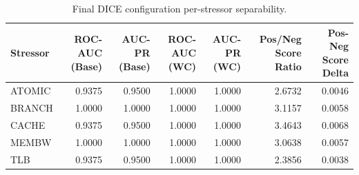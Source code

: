 \begin{table}[t]
\centering
\caption{Final DICE configuration per-stressor separability.}
\label{tab:dice_full_stressor}
\footnotesize
\begin{tabular}{lrrrrrr}
\toprule
Stressor & ROC-AUC (Base) & AUC-PR (Base) & ROC-AUC (WC) & AUC-PR (WC) & Pos/Neg Score Ratio & Pos-Neg Score Delta \\
\midrule
ATOMIC & 0.9375 & 0.9500 & 1.0000 & 1.0000 & 2.6732 & 0.0046 \\
BRANCH & 1.0000 & 1.0000 & 1.0000 & 1.0000 & 3.1157 & 0.0058 \\
CACHE & 0.9375 & 0.9500 & 1.0000 & 1.0000 & 3.4643 & 0.0068 \\
MEMBW & 1.0000 & 1.0000 & 1.0000 & 1.0000 & 3.0638 & 0.0057 \\
TLB & 0.9375 & 0.9500 & 1.0000 & 1.0000 & 2.3856 & 0.0038 \\
\bottomrule
\end{tabular}

\end{table}
